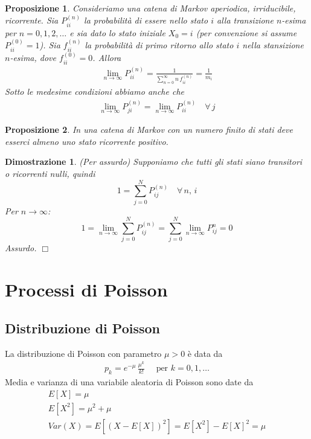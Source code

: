 \documentclass{article}
\newtheorem{proposizione}{Proposizione}[section]
\newtheorem*{dimostrazione*}{Dimostrazione}
\newcommand*{\QED}{\hfill\ensuremath{\Box}}
\begin{document}
\begin{proposizione}
\label{mc_teorema_limite_fondamentale}
Consideriamo una catena di Markov aperiodica, irriducibile, ricorrente. Sia $P_{ii}^{(n)}$ la probabilità di essere nello stato $i$ alla transizione $n$-esima per $n=0,1,2,\hdots$ e sia dato lo stato iniziale $X_0 = i$ (per convenzione si assume $P_{ii}^{(0)} = 1$). Sia $f_{ii}^{(n)}$ la probabilità di primo ritorno allo stato $i$ nella stansizione $n$-esima, dove $f_{ii}^{(0)} = 0$. Allora
\begin{align}
\lim_{n\to \infty} P_{ii}^{(n)} = \frac{1}{\sum_{n=0}^{\infty} n\,f_{ii}^{(n)}} = \frac{1}{m_i}
\end{align}
Sotto le medesime condizioni abbiamo anche che
\begin{align}
\lim_{n\to\infty} P_{ji}^{(n)} = \lim_{n\to\infty} P_{ii}^{(n)}\quad \forall\,j
\end{align}
\end{proposizione}

\begin{proposizione}
\label{mc_numero_finito_di stati}
In una catena di Markov con un numero finito di stati deve esserci almeno uno stato ricorrente positivo.
\end{proposizione}
\begin{dimostrazione*}
(Per assurdo) Supponiamo che tutti gli stati siano transitori o ricorrenti nulli, quindi
$$
1 = \sum_{j=0}^N P_{ij}^{(n)}\quad \forall\,n,\,i
$$
Per $n \to \infty$:
$$
1 = \lim_{n \to \infty} \sum_{j=0}^N P_{ij}^{(n)}=\sum_{j=0}^N \lim_{n\to \infty} P_{ij}^{n} = 0
$$
Assurdo.
\QED
\end{dimostrazione*}


\newpage
\section{Processi di Poisson}


\subsection{Distribuzione di Poisson}

La distribuzione di Poisson con parametro $\mu > 0$ è data da
\begin{align}
\label{pp_distribuzione_poisson}
p_k = e^{-\mu}\,\frac{\mu^k}{k!}\quad \text{ per } k = 0,1,\hdots
\end{align}
Media e varianza di una variabile aleatoria di Poisson sono date da
\begin{gather*}
E[X] = \mu\\
E[X^2] = \mu^2 + \mu\\
Var(X) = E[(X - E[X])^2] = E[X^2] - E[X]^2 = \mu  
\end{gather*}
\end{document}
